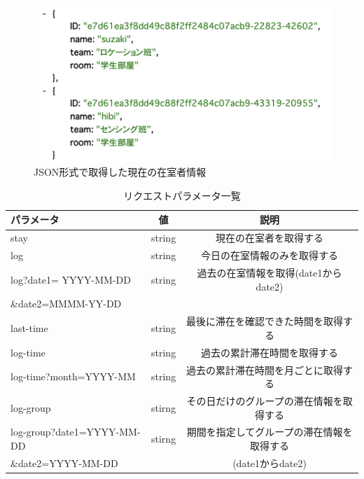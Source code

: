 \begin{figure}[H]
  \begin{center}
    \includegraphics[width=160mm]{image/jsonstay.png}
    \caption{JSON形式で取得した現在の在室者情報}
    \label{jsonstay}
  \end{center}
\end{figure}
\begin{table}[H]
  \begin{center}
    \caption{リクエストパラメータ一覧}
    \label{request}
    \begin{tabular}{|l|c|c|} \hline
      パラメータ             & 値     & 説明                                       \\ \hline
      stay                   & string & 現在の在室者を取得する                     \\ \hline
      log                    & string & 今日の在室情報のみを取得する               \\ \hline
      log?date1= YYYY-MM-DD
                             & string & 過去の在室情報を取得(date1からdate2)       \\

      \&date2=MMMM-YY-DD     &        &                                            \\\hline
      last-time              & string & 最後に滞在を確認できた時間を取得する       \\ \hline
      log-time               & string & 過去の累計滞在時間を取得する               \\ \hline
      log-time?month=YYYY-MM & string & 過去の累計滞在時間を月ごとに取得する       \\ \hline
      log-group              & stirng & その日だけのグループの滞在情報を取得する   \\ \hline
      log-group?date1=YYYY-MM-DD
                             & stirng & 期間を指定してグループの滞在情報を取得する \\
      \&date2=YYYY-MM-DD     &        & (date1からdate2)                           \\\hline
    \end{tabular}
  \end{center}
\end{table}